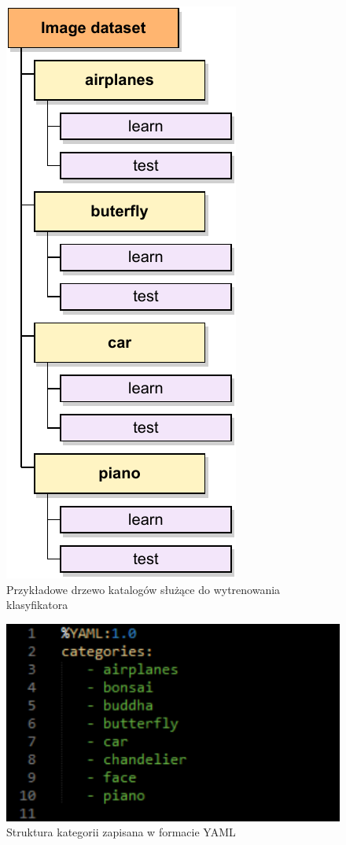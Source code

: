 \begin{compactitem}
	\begin{figure}[h]
		\centering
		\includegraphics[scale=1.0]{graphics/03_implementacja/api-directory-tree.pdf}
		\caption{ Przykładowe drzewo katalogów służące do wytrenowania klasyfikatora }
		\label{fig:api-directory-tree}
	\end{figure}
	
	\begin{figure}[h]
		\centering
		\includegraphics[scale=1.0]{graphics/03_implementacja/yaml-format.pdf}
		\caption{ Struktura kategorii zapisana w formacie YAML }
		\label{fig:yaml-format}
	\end{figure}
	

\end{compactitem}
